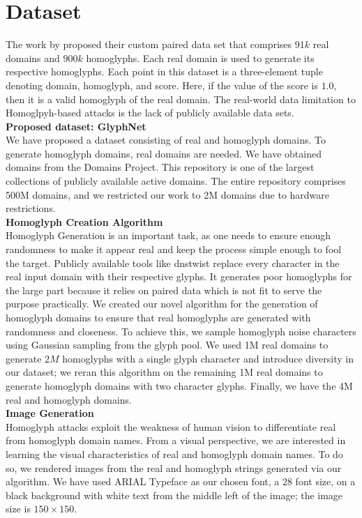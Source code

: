 \documentclass[letterpaper]{article} \usepackage{aaai22}  \usepackage{times}  \usepackage{helvet}  \usepackage{courier}  \usepackage[hyphens]{url}  \usepackage{graphicx} \urlstyle{rm} \def\UrlFont{\rm}  \usepackage{natbib}  \usepackage{caption} \DeclareCaptionStyle{ruled}{labelfont=normalfont,labelsep=colon,strut=off} \frenchspacing  \setlength{\pdfpagewidth}{8.5in}  \setlength{\pdfpageheight}{11in}  \usepackage{algorithm}
\begin{document}
\section{Dataset}
The work by \cite{woodbridge2018detecting} proposed their custom paired data set that comprises $91k$ real domains and $900k$ homoglyphs. Each real domain is used to generate its respective homoglyphs. Each point in this dataset is a three-element tuple denoting domain, homoglyph, and score. Here, if the value of the score is $1.0$, then it is a valid homoglyph of the real domain. The real-world data limitation to Homoglpyh-based attacks is the lack of publicly available data sets. \\

\textbf{Proposed dataset: GlyphNet} \\
We have proposed a dataset consisting of real and homoglyph domains. To generate homoglyph domains, real domains are needed. We have obtained domains from the Domains Project\cite{tb0hdand18:online}. This repository is one of the largest collections of publicly available active domains. The entire repository comprises 500M domains, and we restricted our work to 2M domains due to hardware restrictions. \\

\textbf{Homoglyph Creation Algorithm} \\
Homoglyph Generation is an important task, as one needs to ensure enough randomness to make it appear real and keep the process simple enough to fool the target. Publicly available tools like dnstwist\cite{elceefdn36:online} replace every character in the real input domain with their respective glyphs. It generates poor homoglyphs for the large part because it relies on paired data which is not fit to serve the purpose practically. We created our novel algorithm for the generation of homoglyph domains to ensure that real homoglyphs are generated with randomness and closeness. To achieve this, we sample homoglyph noise characters using Gaussian sampling\cite{boor1999gaussian} from the glyph pool. We used 1M real domains to generate $2M$ homoglyphs with a single glyph character and introduce diversity in our dataset; we reran this algorithm on the remaining 1M real domains to generate homoglyph domains with two character glyphs. Finally, we have the 4M real and homoglyph domains. \\

\textbf{Image Generation} \\
Homoglyph attacks exploit the weakness of human vision to differentiate real from homoglyph domain names. From a visual perspective, we are interested in learning the visual characteristics of real and homoglyph domain names. To do so, we rendered images from the real and homoglyph strings generated via our algorithm. We have used ARIAL Typeface as our chosen font, a $28$ font size, on a black background with white text from the middle left of the image; the image size is $150\times150$. 
\end{document}
